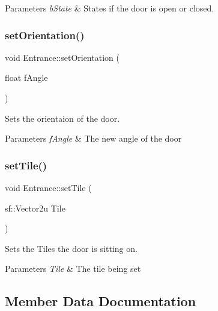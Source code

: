 \begin{DoxyParams}{Parameters}
{\em b\+State} & States if the door is open or closed. \\
\hline
\end{DoxyParams}
\mbox{\label{class_entrance_a47595d251715bcc6367b09d5d2d112cc}} 
\subsubsection{\texorpdfstring{set\+Orientation()}{setOrientation()}}
{\footnotesize\ttfamily void Entrance\+::set\+Orientation (\begin{DoxyParamCaption}\item[{float}]{f\+Angle }\end{DoxyParamCaption})}



Sets the orientaion of the door. 


\begin{DoxyParams}{Parameters}
{\em f\+Angle} & The new angle of the door \\
\hline
\end{DoxyParams}
\mbox{\label{class_entrance_a9136eb4f03ad8243c814a94f49b66c4a}} 
\subsubsection{\texorpdfstring{set\+Tile()}{setTile()}}
{\footnotesize\ttfamily void Entrance\+::set\+Tile (\begin{DoxyParamCaption}\item[{sf\+::\+Vector2u}]{Tile }\end{DoxyParamCaption})}



Sets the Tiles the door is sitting on. 


\begin{DoxyParams}{Parameters}
{\em Tile} & The tile being set \\
\hline
\end{DoxyParams}


\subsection{Member Data Documentation}
\mbox{\label{class_entrance_af155609311931998d9d71fd899f49fe8}} 
